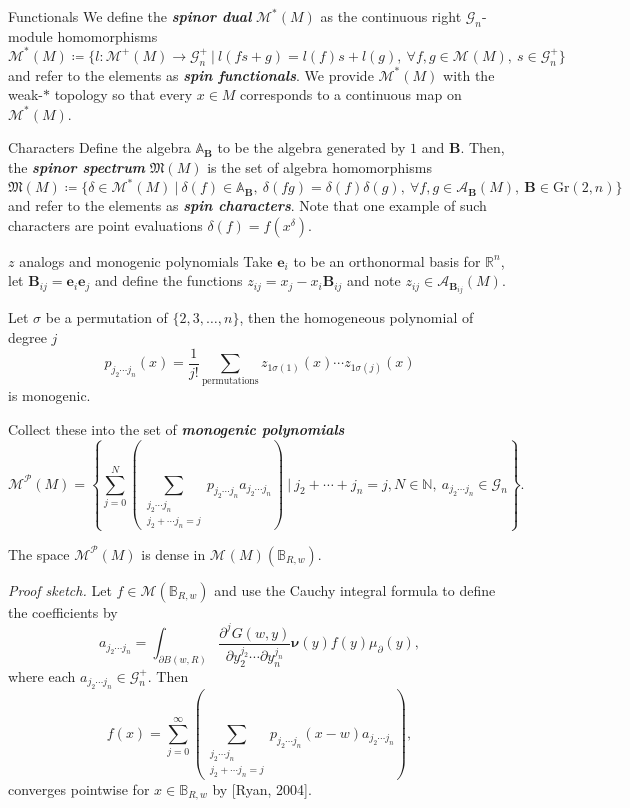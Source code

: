 \documentclass[aspectratio=169,handout]{beamer}
\newcommand\boldgreen[1]{\textcolor{lighter_csu_green}{\emph{\textbf{#1}}}}
\newcommand{\R}{\mathbb{R}}
\newcommand{\algebra}{\mathcal{A}}
\newcommand{\G}{\mathcal{G}}
\newcommand{\characters}{\mathfrak{M}}
\newcommand{\monogenics}{\mathcal{M}}
\newcommand{\dualmonogenics}{\mathcal{M}^*}
\newcommand{\Grassmannian}[2]{\textrm{Gr}(#1,#2)}
\newcommand{\ball}{\mathbb{B}}
\newcommand{\blade}[1]{\boldsymbol{#1}}
\newcommand{\normal}{\blade{\nu}}
\newcommand{\monogenicfields}[1]{\mathcal{M}^{#1}(M)}
\newcommand{\bivector}{\blade{B}}
\begin{document}
\begin{frame}{Functionals}
\vfill
We define the \boldgreen{spinor dual} $\dualmonogenics(M)$ as the continuous right $\G_n$-module homomorphisms
\[
\dualmonogenics(M) \coloneqq \{ l \colon \monogenicfields{+} \to \G_n^+ ~\vert~ l(fs+g)=l(f)s+l(g), ~\forall f,g\in \monogenicfields{}, ~s \in \G_n^+\}
\]
and refer to the elements as \boldgreen{spin functionals}. We provide $\dualmonogenics(M)$ with the weak-$\ast$ topology so that every $x\in M$ corresponds to a continuous map on $\dualmonogenics(M)$.
\vfill
\end{frame}

\begin{frame}{Characters}
\vfill
Define the algebra $\mathbb{A}_{\bivector}$ to be the algebra generated by $1$ and $\bivector$. Then, the \boldgreen{spinor spectrum} $\characters(M)$ is the set of algebra homomorphisms
\[
\characters(M) \coloneqq \{ \delta \in \dualmonogenics(M) ~\vert~ \delta(f)\in\mathbb{A}_{\bivector},~ \delta(fg) = \delta(f)\delta(g),~\forall f,g \in \algebra_{\bivector}(M),~ \bivector \in \Grassmannian{2}{n} \}
\]
and refer to the elements as \boldgreen{spin characters}. Note that one example of such characters are point evaluations $\delta(f)=f(x^\delta)$.
\vfill
\end{frame}

\begin{frame}{$z$ analogs and monogenic polynomials}
Take $\blade{e}_i$ to be an orthonormal basis for $\R^n$, let $\bivector_{ij}=\blade{e}_i\blade{e}_j$ and define the functions $z_{ij}=x_j-x_i \bivector_{ij}$ and note $z_{ij} \in \algebra_{\bivector_{ij}}(M)$. 

Let $\sigma$ be a permutation of $\{2,3,\dots,n\}$, then the homogeneous polynomial of degree $j$
\[
p_{j_2\cdots j_n}(x) = \frac{1}{j!} \sum_{\textrm{permutations}} z_{1\sigma(1)}(x)\cdots z_{1\sigma(j)}(x)
\]
is monogenic.

Collect these into the set of \boldgreen{monogenic polynomials}
\[
    \monogenics^\mathcal{P}(M) = \left\{\sum_{j=0}^N \left(\sum_{\substack{{j_2 \cdots j_n} \\ {j_2 + \cdots j_n = j}}}p_{j_2 \cdots j_n}a_{j_2 \cdots j_n}\right) ~\vert~ j_2+\cdots+j_n = j, N\in \mathbb{N}, ~ a_{j_2\cdots j_n} \in \G_n\right\}.
\]
\end{frame}

\begin{frame}{}
\vfill
\begin{lemma}[Density]
The space $\monogenics^\mathcal{P}(M)$ is dense in $\monogenicfields{}(\ball_{R,w})$.
\end{lemma}
\emph{Proof sketch.} Let $f \in \monogenics{}(\ball_{R,w})$ and use the Cauchy integral formula to define the coefficients by
\[
a_{j_2 \cdots j_n} = \int_{\partial B(w,R)} \frac{\partial^j G(w,y)}{\partial y_2^{j_2} \cdots \partial y_n^{j_n}} \normal(y) f(y) \mu_\partial(y),
\]
where each $a_{j_2\cdots j_n} \in \G_n^+$. Then 
\[
f(x) = \sum_{j=0}^\infty \left(\sum_{\substack{{j_2 \cdots j_n} \\ {j_2 + \cdots j_n = j}}} p_{j_2 \cdots j_n} (x-w) a_{j_2 \cdots j_n} \right),
\]
converges pointwise for $x\in \ball_{R,w}$ by [Ryan, 2004].
\vfill
\end{frame}
\end{document}
